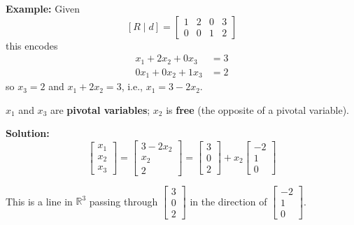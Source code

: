 \documentclass{article}
\begin{document}
\newpage

\textbf{Example:} Given
\[
[R \mid d] = \left[ \begin{array}{ccc|c} 1 & 2 & 0 & 3 \\ 0 & 0 & 1 & 2 \end{array} \right]
\]
this encodes
\begin{align*}
x_1 + 2x_2 + 0x_3 &= 3 \\
0x_1 + 0x_2 + 1x_3 &= 2
\end{align*}
so $x_3 = 2$ and $x_1 + 2x_2 = 3$, i.e., $x_1 = 3 - 2x_2$.

$x_1$ and $x_3$ are \textbf{pivotal variables}; $x_2$ is \textbf{free} (the opposite of a pivotal variable).

\medskip

\textbf{Solution:}
\[
\begin{bmatrix} x_1 \\ x_2 \\ x_3 \end{bmatrix}
=
\begin{bmatrix} 3 - 2x_2 \\ x_2 \\ 2 \end{bmatrix}
=
\begin{bmatrix} 3 \\ 0 \\ 2 \end{bmatrix}
+ x_2 \begin{bmatrix} -2 \\ 1 \\ 0 \end{bmatrix}
\]

This is a line in $\mathbb{R}^3$ passing through $\begin{bmatrix} 3 \\ 0 \\ 2 \end{bmatrix}$ in the direction of $\begin{bmatrix} -2 \\ 1 \\ 0 \end{bmatrix}$.
\end{document}

